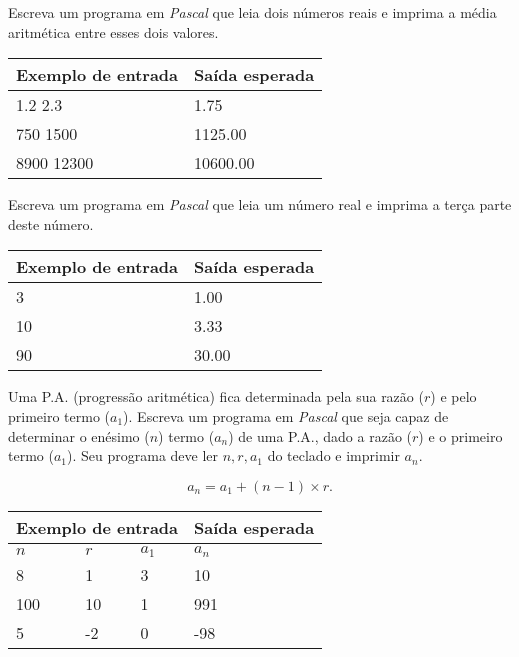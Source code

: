 \item Escreva um programa em \emph{Pascal} que leia dois números reais e 
imprima a média aritmética entre esses dois valores.

\begin{center}
\begin{tabular}{|l|l|} \hline
Exemplo de entrada & Saída esperada \\ \hline
1.2 2.3         & 1.75 \\ \hline
750 1500        & 1125.00  \\ \hline
8900 12300      & 10600.00 \\ \hline
\end{tabular}
\end{center}

\item Escreva um programa em \emph{Pascal} que leia um número real e imprima a 
terça parte deste número.

\begin{center}
\begin{tabular}{|l|l|} \hline
Exemplo de entrada & Saída esperada \\ \hline
3               & 1.00 \\ \hline
10              & 3.33  \\ \hline
90              & 30.00 \\ \hline
\end{tabular}
\end{center}

\item Uma P.A. (progressão aritmética) fica determinada pela sua razão ($r$) 
e pelo primeiro termo ($a_1$). Escreva um programa em \emph{Pascal} que seja 
capaz de determinar o enésimo ($n$) termo ($a_n$) de uma P.A., dado a razão 
($r$) e o primeiro termo ($a_1$). Seu programa deve ler $n, r, a_1$ do teclado
e imprimir $a_n$.

\[
a_n = a_1 + (n-1)\times r.
\]

\begin{center}
\begin{tabular}{|l|l|l|l|} \hline
\multicolumn{3}{|c|}{Exemplo de entrada} & Saída esperada \\ \hline
$n$ & $r$ & $a_1$   & $a_n$               \\ \hline
8 & 1 & 3       & 10                \\ \hline
100 & 10 & 1    & 991                \\ \hline
5 & -2 & 0      & -98                \\ \hline
\end{tabular}
\end{center}

